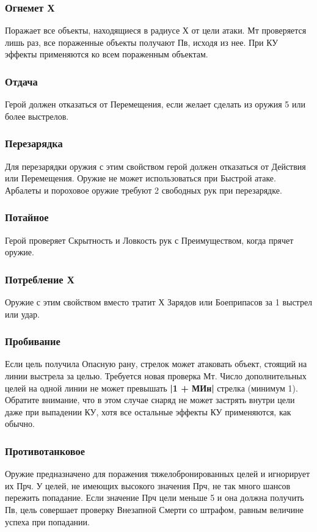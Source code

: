 \subsubsection{Огнемет Х} Поражает все объекты, находящиеся в радиусе Х от цели атаки. Мт проверяется лишь раз, все пораженные объекты получают Пв, исходя из нее. При КУ эффекты применяются ко всем пораженным объектам.
\subsubsection{Отдача} Герой должен отказаться от Перемещения, если желает сделать из оружия 5 или более выстрелов.
\subsubsection{Перезарядка} Для перезарядки оружия с этим свойством герой должен отказаться от Действия или Перемещения. Оружие не может использоваться при Быстрой атаке. Арбалеты и пороховое оружие требуют 2 свободных рук при перезарядке.
\subsubsection{Потайное} Герой проверяет Скрытность и Ловкость рук с Преимуществом, когда прячет оружие.
\subsubsection{Потребление Х} Оружие с этим свойством вместо тратит Х Зарядов или Боеприпасов за 1 выстрел или удар.
\subsubsection{Пробивание} Если цель получила Опасную рану, стрелок может атаковать объект, стоящий на линии выстрела за целью. Требуется новая проверка Мт. Число дополнительных целей на одной линии не может превышать \textbf{|1 + МИн|} стрелка (минимум 1). Обратите внимание, что в этом случае снаряд не может застрять внутри цели даже при выпадении КУ, хотя все остальные эффекты КУ применяются, как обычно.
\subsubsection{Противотанковое} Оружие предназначено для поражения тяжелобронированных целей и игнорирует их Прч. У целей, не имеющих высокого значения Прч, не так много шансов пережить попадание. Если значение Прч цели меньше 5 и она должна получить Пв, цель совершает проверку Внезапной Смерти со штрафом, равным величине успеха при попадании.
